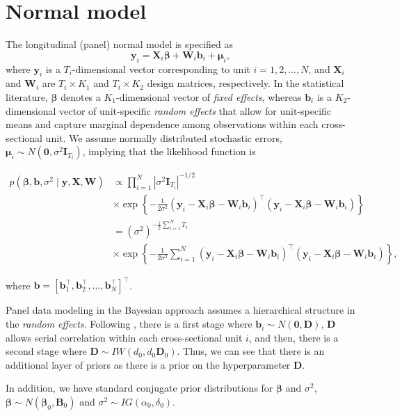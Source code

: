 \section{Normal model}\label{sec91}

The longitudinal (panel) normal model is specified as
\[
\bm{y}_i = \bm{X}_i \bm{\beta} + \bm{W}_i \bm{b}_i + \bm{\mu}_i,
\]
where $\bm{y}_i$ is a $T_i$-dimensional vector corresponding to unit $i = 1, 2, \dots, N$, and $\bm{X}_i$ and $\bm{W}_i$ are $T_i \times K_1$ and $T_i \times K_2$ design matrices, respectively. In the statistical literature, $\bm{\beta}$ denotes a $K_1$-dimensional vector of \textit{fixed effects}, whereas $\bm{b}_i$ is a $K_2$-dimensional vector of unit-specific \textit{random effects} that allow for unit-specific means and capture marginal dependence among observations within each cross-sectional unit. We assume normally distributed stochastic errors, $\bm{\mu}_i \sim N(\bm{0}, \sigma^2 \bm{I}_{T_i})$, implying that the likelihood function is

\begin{align*}
	p(\bm{\beta}, \bm{b}, \sigma^2 \mid \bm{y}, \bm{X}, \bm{W})
	&\propto
	\prod_{i=1}^N |\sigma^2 \bm{I}_{T_i}|^{-1/2}\\
	&\times
	\exp\!\left\{
	-\frac{1}{2\sigma^2}
	(\bm{y}_i - \bm{X}_i \bm{\beta} - \bm{W}_i \bm{b}_i)^{\top}
	(\bm{y}_i - \bm{X}_i \bm{\beta} - \bm{W}_i \bm{b}_i)
	\right\} \\[3pt]
	&=
	(\sigma^2)^{-\frac{1}{2}\sum_{i=1}^N T_i}\\
	&\times
	\exp\!\left\{
	-\frac{1}{2\sigma^2}
	\sum_{i=1}^N
	(\bm{y}_i - \bm{X}_i \bm{\beta} - \bm{W}_i \bm{b}_i)^{\top}
	(\bm{y}_i - \bm{X}_i \bm{\beta} - \bm{W}_i \bm{b}_i)
	\right\},
\end{align*}

where $\bm{b} = [\bm{b}_1^{\top}, \bm{b}_2^{\top}, \dots, \bm{b}_N^{\top}]^{\top}$.

Panel data modeling in the Bayesian approach assumes a hierarchical structure in the \textit{random effects}. Following \cite{Chib1999}, there is a first stage where $\bm{b}_i\sim{N}(\bm{0},\bm{D})$, $\bm{D}$ allows serial correlation within each cross-sectional unit $i$, and then, there is a second stage where $\bm{D}\sim{I}{W}(d_0,d_0\bm{D}_0)$. Thus, we can see that there is an additional layer of priors as there is a prior on the hyperparameter $\bm{D}$. 

In addition, we have standard conjugate prior distributions for $\bm{\beta}$ and $\sigma^2$, $\bm{\beta} \sim {N}(\bm{\beta}_0,\bm{B}_0)$ and 
$\sigma^2 \sim {I}{G}(\alpha_0, \delta_0)$. 

